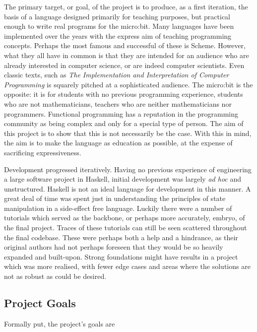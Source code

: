 \documentclass[12pt, a4paper]{report}
\begin{document}
The primary target, or goal, of the project is to produce, as a first iteration, the basis of a
language designed primarily for teaching purposes, but practical enough to write real programs for
the micro:bit. Many languages have been implemented over the years with the express aim of teaching
programming concepts. Perhaps the most famous and successful of these is Scheme. However, what they
all have in common is that they are intended for an audience who are already interested in computer
science, or are indeed computer scientists. Even classic texts, such as \textit{The Implementation
and Interpretation of Computer Programming} is squarely pitched at a sophisticated audience.
The micro:bit is the opposite: it is for students with no previous programming experience,
students who are not mathematicians, teachers who are neither mathematicians nor programmers.
Functional programming has a reputation in the programming community as being complex and only for a
special type of person. The aim of this project is to show that this is not necessarily be the case.
With this in mind, the aim is to make the language as education as possible, at the expense of
sacrificing expressiveness. 


Development progressed iteratively. Having no previous experience of engineering a large software
project in Haskell, initial development was largely \textit{ad hoc} and unstructured. Haskell is not
an ideal language for development in this manner. A great deal of time was spent just in understanding 
the principles of state manipulation in a side-effect free language. Luckily there were a number of 
tutorials which served as the backbone, or perhaps more accurately, embryo, of the final project. 
Traces of these tutorials can still be seen scattered throughout the final codebase. These were 
perhaps both a help and a hindrance, as their original authors had not perhaps foreseen that 
they would be so heavily expanded and built-upon. Strong foundations might have results in a project 
which was more realised, with fewer edge cases and areas where the solutions are not as robust as could be desired. \\

\subsection{Project Goals}
Formally put, the project's goals are 
\end{document}
